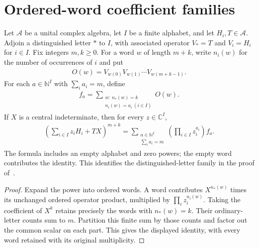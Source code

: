 \section{Ordered-word coefficient families}

\begin{theorem}
    \label{thm:word_coefficient_expansion}
    \leanok
    Let $\mathcal A$ be a unital complex algebra, let $I$ be a finite alphabet,
    and let $H_i,T\in\mathcal A$. Adjoin a distinguished letter $\ast$ to $I$,
    with associated operator $V_\ast=T$ and $V_i=H_i$ for $i\in I$.
    Fix integers $m,k\ge0$. For a word $w$ of length $m+k$, write $n_i(w)$
    for the number of occurrences of $i$ and put
    \begin{align*}
        O(w)=V_{w(0)}V_{w(1)}\cdots V_{w(m+k-1)}.
    \end{align*}
    For each $a\in\mathbb N^I$ with $\sum_i a_i=m$, define
    \begin{align*}
        f_a=\sum_{\substack{w:\ n_\ast(w)=k\\n_i(w)=a_i\ (i\in I)}}O(w).
    \end{align*}
    If $X$ is a central indeterminate, then for every $z\in\mathbb C^I$,
    \begin{align*}
        [X^k]\left(\sum_{i\in I}z_iH_i+TX\right)^{m+k}
            =\sum_{\substack{a\in\mathbb N^I\\\sum_i a_i=m}}
                \left(\prod_{i\in I}z_i^{a_i}\right)f_a.
    \end{align*}
    The formula includes an empty alphabet and zero powers; the empty word
    contributes the identity. This identifies the distinguished-letter family
    in the proof of~\cite[Lemma~4.2]{Arad2013AreaLaw}.
\end{theorem}
\begin{proof}
    \leanok
    Expand the power into ordered words. A word contributes
    $X^{n_\ast(w)}$ times its unchanged ordered operator product, multiplied by
    $\prod_i z_i^{n_i(w)}$. Taking the coefficient of $X^k$ retains precisely
    the words with $n_\ast(w)=k$. Their ordinary-letter counts sum to $m$.
    Partition this finite sum by those counts and factor out the common scalar
    on each part. This gives the displayed identity, with every word retained
    with its original multiplicity.
\end{proof}

